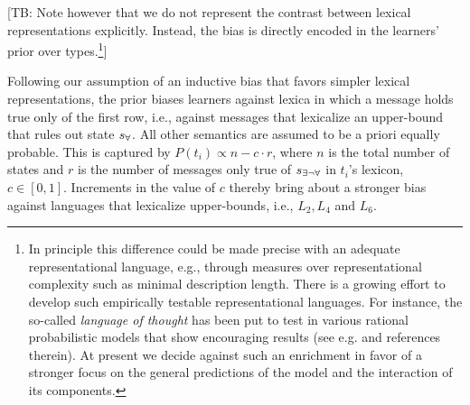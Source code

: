 \documentclass[a4paper]{article}
\newcommand{\tb}[1]{\textcolor[rgb]{.8,.33,.0}{[TB: #1]}}%
\newcommand{\state}{\ensuremath{s}\xspace}		%
\newcommand{\mystate}[1]{\ensuremath{\state_{\text{#1}}}\xspace} %
\newcommand{\ssome}{\mystate{\ensuremath{\exists\neg\forall}}}
\newcommand{\sall}{\mystate{\ensuremath{\forall}}}
\begin{document}
\tb{ Note however that we do not represent the contrast between lexical representations explicitly. Instead, the bias is directly encoded in the learners' prior over types.\footnote{In principle this difference could be made precise with an adequate representational language, e.g., through measures over representational complexity such as minimal description length.  There is a growing effort to develop such empirically  testable  representational  languages. For instance, the so-called {\em language of thought} has been put to test in various rational probabilistic models that show encouraging results (see e.g. \citealt{katz+etal:2008, piantadosi+etal:underreview, piantadosi+etal:2012a} and references therein). At present we decide against such an enrichment in favor of a stronger focus on the general predictions of the model and the interaction of its components.}}

Following our assumption of an inductive bias that favors simpler lexical representations, the prior biases learners against lexica in which a message holds true only of the first row, i.e., against messages that lexicalize an upper-bound that rules out state \sall. All other semantics are assumed to be a priori equally probable. This is captured by $P(t_i) \propto n - c \cdot r$, where $n$ is the total number of states and $r$ is the number of messages only true of \ssome in $t_i$'s lexicon, $c \in [0,1]$. Increments in the value of $c$ thereby bring about a stronger bias against languages that lexicalize upper-bounds, i.e., $L_2, L_4$ and $L_6$.
\end{document}
